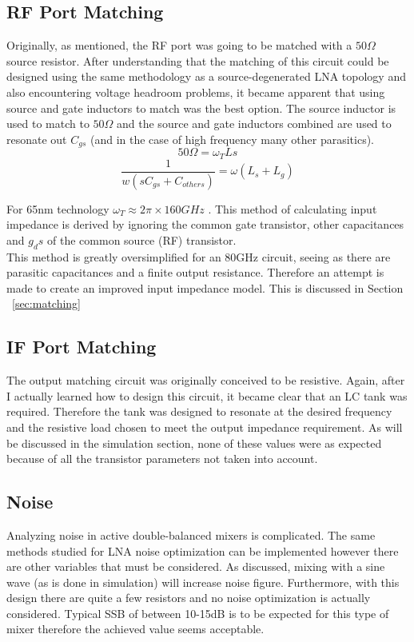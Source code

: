 \documentclass{article}                                                         %
\begin{document}
\subsection{RF Port Matching}
Originally, as mentioned, the RF port was going to be matched with a $50 \Omega $ source resistor. After understanding that the
matching of this circuit could be designed using the same methodology as a source-degenerated LNA topology and also encountering
voltage headroom problems, it became apparent that using source and gate inductors to match was the best option. The source inductor is
used to match to $50\Omega$ and the source and gate inductors combined are used to resonate out $C_{gs}$ (and in the case of high frequency
many other parasitics).
\begin{equation}
  \label{eq:InputRes}
  50 \Omega = \omega_TLs
\end{equation}
\begin{equation}
  \label{eq:GateInd}
  \dfrac{1}{w(sC_{gs}+C_{others})} = \omega(L_s+L_g)
\end{equation}

\vspace{3mm}For 65nm technology $\omega_T \approx 2\pi \times 160GHz$ \cite{Razavi:2011:RM:2132691}.
This method of calculating input impedance is derived by ignoring the common gate transistor,
other capacitances and $g_ds$ of the common source (RF) transistor. \\

This method is greatly oversimplified for an 80GHz circuit, seeing as there are parasitic capacitances and a finite output resistance.
Therefore an attempt is made to create an improved input impedance model. This is discussed in Section ~\ref{sec:matching}

\subsection{IF Port Matching}
The output matching circuit was originally conceived to be resistive. Again, after I actually learned how to design this circuit,
it became clear that an LC tank was required. Therefore the tank was designed to resonate at the desired frequency and the resistive
load chosen to meet the output impedance requirement. As will be discussed in the simulation section, none of these values were as expected
because of all the transistor parameters not taken into account.

\subsection{Noise}
Analyzing noise in active double-balanced mixers is complicated. The same methods studied for LNA noise optimization can be implemented however
there are other variables that must be considered. As discussed, mixing with a sine wave (as is done in simulation) will increase noise figure.
Furthermore, with this design there are quite a few resistors and no noise optimization is actually considered. Typical SSB of between 10-15dB is
to be expected for this type of mixer therefore the achieved value seems acceptable.
\end{document}
